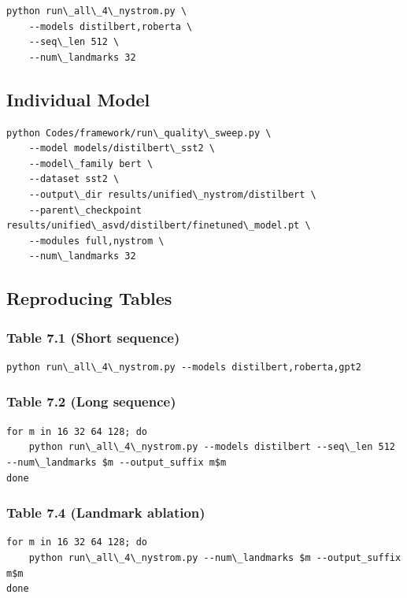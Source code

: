 \begin{lstlisting}
python run\_all\_4\_nystrom.py \
    --models distilbert,roberta \
    --seq\_len 512 \
    --num\_landmarks 32
\end{lstlisting}

\subsection{Individual Model}

\begin{lstlisting}
python Codes/framework/run\_quality\_sweep.py \
    --model models/distilbert\_sst2 \
    --model\_family bert \
    --dataset sst2 \
    --output\_dir results/unified\_nystrom/distilbert \
    --parent\_checkpoint results/unified\_asvd/distilbert/finetuned\_model.pt \
    --modules full,nystrom \
    --num\_landmarks 32
\end{lstlisting}

\subsection{Reproducing Tables}

\subsubsection{Table 7.1 (Short sequence)}

\begin{lstlisting}
python run\_all\_4\_nystrom.py --models distilbert,roberta,gpt2
\end{lstlisting}

\subsubsection{Table 7.2 (Long sequence)}

\begin{lstlisting}
for m in 16 32 64 128; do
    python run\_all\_4\_nystrom.py --models distilbert --seq\_len 512 --num\_landmarks $m --output_suffix m$m
done
\end{lstlisting}

\subsubsection{Table 7.4 (Landmark ablation)}

\begin{lstlisting}
for m in 16 32 64 128; do
    python run\_all\_4\_nystrom.py --num\_landmarks $m --output_suffix m$m
done
\end{lstlisting}

